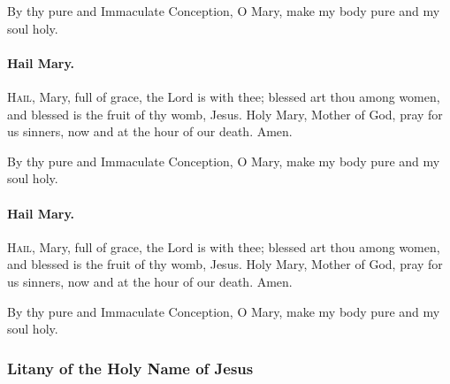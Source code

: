 \documentclass{article}
\begin{document}
\begin{multicols}{3}
By thy pure and Immaculate Conception, O Mary, make my body pure and my soul holy.

\paragraph{Hail Mary.}
\textsc{Hail}, Mary, full of grace, the Lord is with thee;
blessed art thou among women, and blessed is the fruit of
thy womb, Jesus.  Holy Mary, Mother of God, pray for us sinners,
now and at the hour of our death. Amen.

By thy pure and Immaculate Conception, O Mary, make my body pure and my soul holy.

\paragraph{Hail Mary.}
\textsc{Hail}, Mary, full of grace, the Lord is with thee;
blessed art thou among women, and blessed is the fruit of
thy womb, Jesus.  Holy Mary, Mother of God, pray for us sinners,
now and at the hour of our death. Amen.

By thy pure and Immaculate Conception, O Mary, make my body pure and my soul holy.

\subsubsection*{Litany of the Holy Name of Jesus}


\end{multicols}
\end{document}
